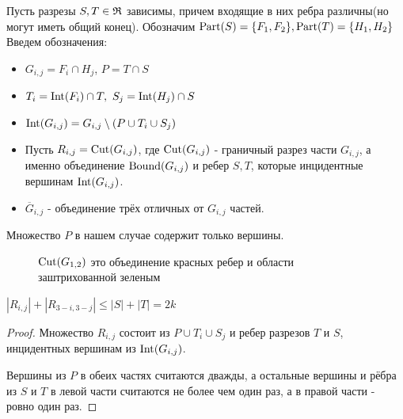 \begin{prop*}
	Пусть разрезы $S, T \in \mathfrak{R}$ зависимы, причем входящие в них ребра различны(но могут иметь общий конец).
	Обозначим $\operatorname{Part}(S) = \{F_1, F_2\}, \operatorname{Part}(T) = \{H_1, H_2\}$
	Введем обозначения:

	\begin{itemize}
		\item $G_{i,j} = F_i \cap H_j$, $P = T \cap S$
		\item  $T_i = \operatorname{Int}(F_i) \cap T, \ S_j = \operatorname{Int}(H_j) \cap S$
		\item $\operatorname{Int}(G_{i, j}) = G_{i, j} \setminus (P \cup T_i \cup S_j)$
		\item Пусть  $R_{i, j} = \operatorname{Cut}(G_{i, j})$, где $\operatorname{Cut}(G_{i, j})$ - граничный разрез части  $G_{i, j}$, а именно объединение  $\operatorname{Bound}(G_{i, j})$ и ребер  $S, T$, которые инцидентные вершинам  $\operatorname{Int}(G_{i, j})$.
		\item $\overline G_{i, j}$ - объединение трёх отличных от  $G_{i, j}$ частей.
	\end{itemize}

	Множество $P$ в нашем случае содержит только вершины.

\end{prop*}

\begin{figure}[ht]
    \centering
	\caption{$\operatorname{Cut}(G_{1, 2})$ это объединение красных ребер и области заштрихованной зеленым}
    \label{fig:prop_dependent_cuts_k_connected_graph}
\end{figure}

\begin{customlm}{3.2} \label{lemma:3_2}
	$|R_{i, j}| + |R_{3 - i, 3 - j}| \leqslant |S| + |T| = 2k$
\end{customlm}

\begin{proof}
	Множество $R_{i, j}$ состоит из  $P \cup T_i \cup S_j$ и ребер разрезов  $T$ и  $S$, инцидентных вершинам из  $\operatorname{Int}(G_{i, j})$.

	Вершины из $P$ в обеих частях считаются дважды, а остальные вершины и рёбра из  $S$ и  $T$ в левой части считаются не более чем один раз, а в правой части - ровно один раз.
\end{proof}



